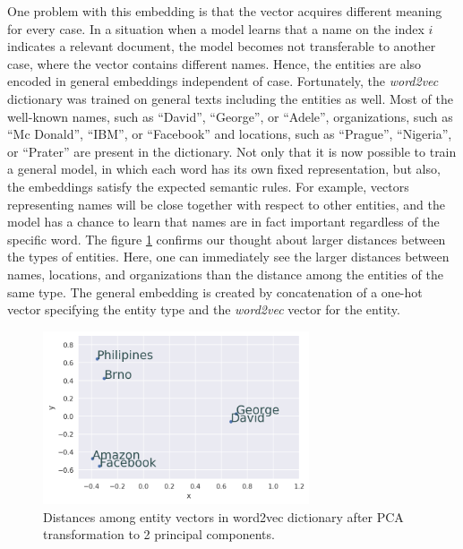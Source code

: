 \documentclass[
  digital, %
  notable,   %
  nolof,     %
  nolot,     %
]{fithesis3}
\begin{document}
One problem with this embedding is that the vector acquires different meaning for every case.
In a situation when a model learns that a name on the index $i$ indicates a relevant document, the model becomes not transferable to another case, where the vector contains different names.
Hence, the entities are also encoded in general embeddings independent of case.
Fortunately, the \textit{word2vec} dictionary was trained on general texts including the entities as well.
Most of the well-known names, such as ``David'', ``George'', or ``Adele'', organizations, such as ``Mc Donald'', ``IBM'', or ``Facebook'' and locations, such as ``Prague'', ``Nigeria'', or ``Prater'' are present in the dictionary.
Not only that it is now possible to train a general model, in which each word has its own fixed representation, but also, the embeddings satisfy the expected semantic rules.
For example, vectors representing names will be close together with respect to other entities, and the model has a chance to learn that names are in fact important regardless of the specific word.
The figure \ref{fig:entity_distances} confirms our thought about larger distances between the types of entities.
Here, one can immediately see the larger distances between names, locations, and organizations than the distance among the entities of the same type.
The general embedding is created by concatenation of a one-hot vector specifying the entity type and the \textit{word2vec} vector for the entity.

\begin{figure}[h]
\centering
\caption{Distances among entity vectors in word2vec dictionary after PCA transformation to 2 principal components.}
\label{fig:entity_distances}
\includegraphics[width=0.7\textwidth]{img/entities_distances}
\end{figure}
\end{document}
